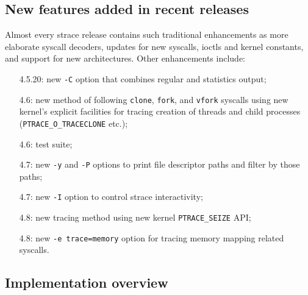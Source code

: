\documentclass[10pt, a5paper]{article}
\def\vv!#1!{\texttt{#1}}
\begin{document}
\subsection*{New features added in recent releases}

Almost every strace release contains such traditional enhancements as  more elaborate syscall decoders, updates for new syscalls, ioctls and kernel constants, and support for new architectures.  Other \linebreak enhancements include:

\begin{itemize}
  \item [4.5.20:] new \vv!-C! option that combines regular and statistics output;
  \item [4.6:] new method of following \vv!clone!, \vv!fork!, and \vv!vfork! syscalls using new kernel's explicit facilities for tracing creation of threads and child processes (\vv!PTRACE\_O\_TRACECLONE! etc.);
  \item [4.6:] test suite;
  \item [4.7:] new \vv!-y! and \vv!-P! options to print file descriptor paths and filter by those paths;
  \item [4.7:] new \vv!-I! option to control strace interactivity;
  \item [4.8:] new tracing method using new kernel \vv!PTRACE\_SEIZE! API;
  \item [4.8:] new \vv!-e trace=memory! option for tracing memory mapping related syscalls.
\end{itemize}

\subsection*{Implementation overview}
\end{document}
